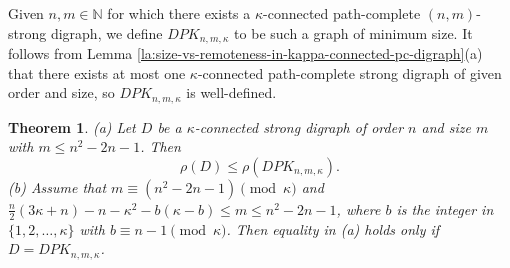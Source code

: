 \documentclass[a4paper,11pt]{article}
\newtheorem{theorem}{Theorem}[section]
\begin{document}
Given $n,m \in \mathbb{N}$ for which there exists a $\kappa$-connected
path-complete $(n,m)$-strong digraph, we define $DPK_{n,m,\kappa}$ to be such a graph
of minimum size. It follows from Lemma \ref{la:size-vs-remoteness-in-kappa-connected-pc-digraph}(a) 
that there exists at most one $\kappa$-connected path-complete strong digraph of given order 
and size, so $DPK_{n,m,\kappa}$ is well-defined. 

	\begin{theorem}
(a) Let $D$ be a $\kappa$-connected strong digraph of order $n$ and size $m$ with $ m \leq n^2-2n-1$. Then 
	\begin{equation} \label{eq:bound-on-rho-for-kappa-digraph}
\rho(D) \leq \rho(DPK_{n,m,\kappa}).
\end{equation}
(b) Assume that $m \equiv (n^2-2n-1) \pmod{\kappa} $ and $ \frac{n}{2}(3\kappa+n)-n-\kappa^2-b(\kappa-b) \leq m \leq n^2-2n-1$, where $b$ is the integer in $\{1,2,\ldots, \kappa\}$ with
$b \equiv n-1 \pmod{\kappa}$. Then equality in (a) holds only if $D=DPK_{n,m,\kappa}$.
	\end{theorem}
	
\end{document}
